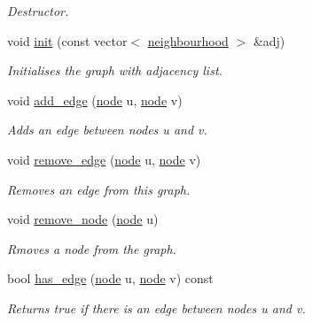 \begin{DoxyCompactItemize}
\begin{DoxyCompactList}\small\item\em Destructor. \end{DoxyCompactList}\item 
void \hyperlink{classlgraph_1_1utils_1_1uugraph_aba5c0eee90905a7047748fa2d48dce4b}{init} (const vector$<$ \hyperlink{namespacelgraph_1_1utils_a0f2ef47028a466d26841709e705390ac}{neighbourhood} $>$ \&adj)
\begin{DoxyCompactList}\small\item\em Initialises the graph with adjacency list. \end{DoxyCompactList}\item 
void \hyperlink{classlgraph_1_1utils_1_1uugraph_a3729660ecdd5d7ed338f0cd687403cbf}{add\-\_\-edge} (\hyperlink{namespacelgraph_1_1utils_a7bd66ede3805ef121bc2835bd48de0cf}{node} u, \hyperlink{namespacelgraph_1_1utils_a7bd66ede3805ef121bc2835bd48de0cf}{node} v)
\begin{DoxyCompactList}\small\item\em Adds an edge between nodes {\itshape u} and {\itshape v}. \end{DoxyCompactList}\item 
void \hyperlink{classlgraph_1_1utils_1_1uugraph_ae564207e9c3887aa6be115bce28c66b8}{remove\-\_\-edge} (\hyperlink{namespacelgraph_1_1utils_a7bd66ede3805ef121bc2835bd48de0cf}{node} u, \hyperlink{namespacelgraph_1_1utils_a7bd66ede3805ef121bc2835bd48de0cf}{node} v)
\begin{DoxyCompactList}\small\item\em Removes an edge from this graph. \end{DoxyCompactList}\item 
void \hyperlink{classlgraph_1_1utils_1_1uugraph_a361156be732eb6c3b01da1ab685501ef}{remove\-\_\-node} (\hyperlink{namespacelgraph_1_1utils_a7bd66ede3805ef121bc2835bd48de0cf}{node} u)
\begin{DoxyCompactList}\small\item\em Rmoves a node from the graph. \end{DoxyCompactList}\item 
bool \hyperlink{classlgraph_1_1utils_1_1uugraph_a1970a2f371f20284478246a83292f9bb}{has\-\_\-edge} (\hyperlink{namespacelgraph_1_1utils_a7bd66ede3805ef121bc2835bd48de0cf}{node} u, \hyperlink{namespacelgraph_1_1utils_a7bd66ede3805ef121bc2835bd48de0cf}{node} v) const 
\begin{DoxyCompactList}\small\item\em Returns true if there is an edge between nodes {\itshape u} and {\itshape v}. \end{DoxyCompactList}\item 

\end{DoxyCompactItemize}
